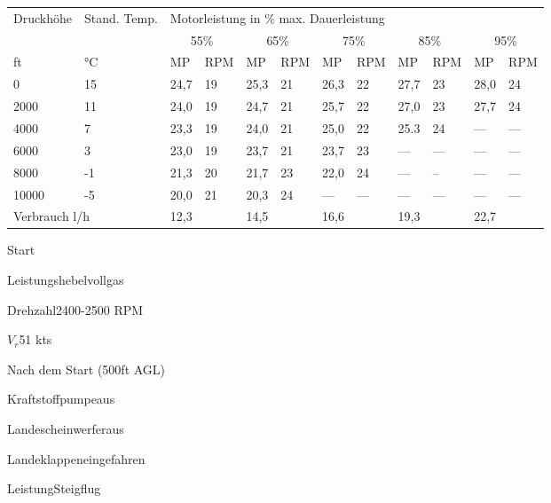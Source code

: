 \begin{table*}[t]
  \centering
  \begin{tabular}{@{}ll|ll|ll|ll|ll|ll@{}}
    \multirow{2}{*}{Druckhöhe} &
      \multirow{2}{*}{Stand. Temp.} &
      \multicolumn{10}{l}{Motorleistung in \% max. Dauerleistung} \\ \cmidrule(l){3-12} 
     &
       &
      \multicolumn{2}{c}{55\%} &
      \multicolumn{2}{c}{65\%} &
      \multicolumn{2}{c}{75\%} &
      \multicolumn{2}{c}{85\%} &
      \multicolumn{2}{c}{95\%} \\ \cmidrule(r){1-2}
    ft    & °C & MP   & RPM & MP   & RPM & MP   & RPM & MP   & RPM & MP   & RPM \\
    0     & 15 & 24,7 & 19  & 25,3 & 21  & 26,3 & 22  & 27,7 & 23  & 28,0 & 24  \\\hline
    2000  & 11 & 24,0 & 19  & 24,7 & 21  & 25,7 & 22  & 27,0 & 23  & 27,7 & 24  \\\hline
    4000  & 7  & 23,3 & 19  & 24,0 & 21  & 25,0 & 22  & 25.3 & 24  & ---  & --- \\\hline
    6000  & 3  & 23,0 & 19  & 23,7 & 21  & 23,7 & 23  & ---  & --- & ---  & --- \\\hline
    8000  & -1 & 21,3 & 20  & 21,7 & 23  & 22,0 & 24  & ---  & --  & ---  & --- \\\hline
    10000 & -5 & 20,0 & 21  & 20,3 & 24  & ---  & --- & ---  & --- & ---  & --- \\\hline
    \multicolumn{2}{l}{Verbrauch l/h} &
      \multicolumn{2}{l}{12,3} &
      \multicolumn{2}{l}{14,5} &
      \multicolumn{2}{l}{16,6} &
      \multicolumn{2}{l}{19,3} &
      \multicolumn{2}{l}{22,7}
    \end{tabular}
\end{table*}

\begin{task}
  \begin{checklist}{Start}
    \item{Leistungshebel}{vollgas}
    \item{Drehzahl}{2400-2500 RPM}
    \item{$V_{r}$}{51 kts}
  \end{checklist}
\end{task}

\begin{task}
  \begin{checklist}{Nach dem Start (500ft AGL)}
    \item{Kraftstoffpumpe}{aus}
    \item{Landescheinwerfer}{aus}
    \item{Landeklappen}{eingefahren}
    \item{Leistung}{Steigflug}
  \end{checklist}
\end{task}

